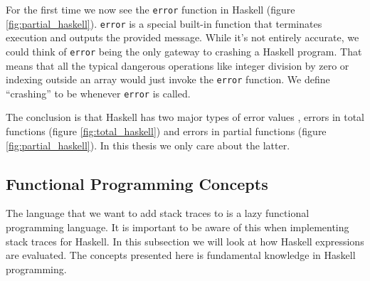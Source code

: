 \begin{figure}
\end{figure}

For the first time we now see the \texttt{error} function in Haskell (figure \ref{fig:partial_haskell}).  \texttt{error} is a
special built-in function that terminates execution and outputs the provided
message. While it's not entirely accurate, we could think of \texttt{error}
being the only gateway to crashing a Haskell program. That means that all the
typical dangerous operations like integer division by zero or indexing outside
an array would just invoke the \texttt{error} function. We define ``crashing''
to be whenever \texttt{error} is called.

The conclusion is that Haskell has two major types of error
values \cite{o2008real} \cite{ezyang_8_ways_to_report_errors}, errors in total functions (figure
\ref{fig:total_haskell}) and errors in partial functions (figure
\ref{fig:partial_haskell}). In this thesis we only care about the
latter.

\subsection{Functional Programming Concepts}

The language that we want to add stack traces to is a lazy functional
programming language. It is important to be aware of this when
implementing stack traces for Haskell. In this subsection we will look
at how Haskell expressions are evaluated. The concepts presented here
is fundamental knowledge in Haskell programming.

